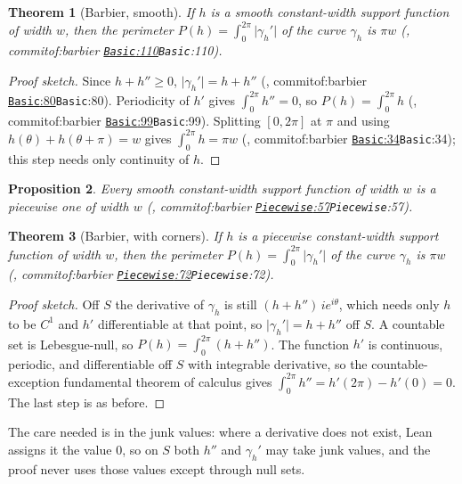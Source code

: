 \documentclass[11pt]{article}
\newtheorem{theorem}{Theorem}
\newtheorem{proposition}[theorem]{Proposition}
\theoremstyle{definition}
\theoremstyle{remark}
\newcommand{\commitof}[1]{\csname commitof:#1\endcsname}
\newcommand{\repo}[1]{https://github.com/jpbald93/#1}
\newcommand{\src}[4]{\ifcsname commitof:#1\endcsname
  \href{\repo{#1}/blob/\commitof{#1}/#2/#3.lean\#L#4}{\texttt{#3}:#4}\else\texttt{#3}:#4\fi}
\begin{document}
\begin{theorem}[Barbier, smooth]\label{thm:barbier}
If $h$ is a smooth constant-width support function of width $w$, then the perimeter
$P(h) = \int_0^{2\pi}\lvert\gamma_h'\rvert$ of the curve $\gamma_h$ is $\pi w$
(, \src{barbier}{Barbier}{Basic}{110}).
\end{theorem}

\begin{proof}[Proof sketch]
Since $h+h''\ge 0$, $\lvert\gamma_h'\rvert = h+h''$ (, \src{barbier}{Barbier}{Basic}{80}). Periodicity of $h'$ gives $\int_0^{2\pi}h'' = 0$, so
$P(h) = \int_0^{2\pi}h$ (, \src{barbier}{Barbier}{Basic}{99}).
Splitting $[0,2\pi]$ at $\pi$ and using $h(\theta)+h(\theta+\pi) = w$ gives $\int_0^{2\pi}h = \pi w$
(, \src{barbier}{Barbier}{Basic}{34}); this step needs only
continuity of $h$.
\end{proof}

\begin{proposition}\label{prop:topw}
Every smooth constant-width support function of width $w$ is a piecewise one of width $w$
(, \src{barbier}{Barbier}{Piecewise}{57}).
\end{proposition}

\begin{theorem}[Barbier, with corners]\label{thm:barbierpw}
If $h$ is a piecewise constant-width support function of width $w$, then the perimeter
$P(h) = \int_0^{2\pi}\lvert\gamma_h'\rvert$ of the curve $\gamma_h$ is $\pi w$
(, \src{barbier}{Barbier}{Piecewise}{72}).
\end{theorem}

\begin{proof}[Proof sketch]
Off $S$ the derivative of $\gamma_h$ is still $(h+h'')\,i e^{i\theta}$, which needs only $h$ to be
$C^1$ and $h'$ differentiable at that point, so $\lvert\gamma_h'\rvert = h+h''$ off $S$. A countable
set is Lebesgue-null, so $P(h) = \int_0^{2\pi}(h+h'')$. The function $h'$ is continuous, periodic,
and differentiable off $S$ with integrable derivative, so the countable-exception fundamental theorem
of calculus gives $\int_0^{2\pi}h'' = h'(2\pi)-h'(0) = 0$. The last step is as before.
\end{proof}

The care needed is in the junk values: where a derivative does not exist, Lean assigns it the value
$0$, so on $S$ both $h''$ and $\gamma_h'$ may take junk values, and the proof never uses those values
except through null sets.
\end{document}
